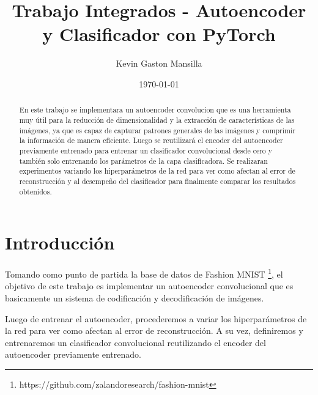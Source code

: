 \documentclass[aps,prl,reprint,groupedaddress]{revtex4-2}
\begin{document}
\title{
Trabajo Integrados - Autoencoder y Clasificador con PyTorch
}

\author{Kevin Gaston Mansilla}

\affiliation{}

\date{\today}

\begin{abstract}
En este trabajo se implementara un autoencoder convolucion que es una
herramienta muy útil para la reducción de dimensionalidad y la extracción de
características de las imágenes, ya que es capaz de capturar patrones generales
de las imágenes y comprimir la información de manera eficiente. Luego se
reutilizará el encoder del autoencoder previamente entrenado para entrenar un
clasificador convolucional desde cero y también solo entrenando los parámetros
de la capa clasificadora. Se realizaran experimentos variando los hiperparámetros
de la red para ver como afectan al error de reconstrucción y al desempeño del
clasificador para finalmente comparar los resultados obtenidos.
\end{abstract}


\maketitle

\section{Introducción}

Tomando como punto de partida la base de datos de Fashion MNIST
\footnote{https://github.com/zalandoresearch/fashion-mnist}, el objetivo de 
este trabajo es implementar un autoencoder convolucional que es basicamente 
un sistema de codificación y decodificación de imágenes. 

Luego de entrenar el autoencoder, procederemos a variar los hiperparámetros de 
la red para ver como afectan al error de reconstrucción. A su vez, definiremos y 
entrenaremos un clasificador convolucional reutilizando el encoder del 
autoencoder previamente entrenado. 
\end{document}
